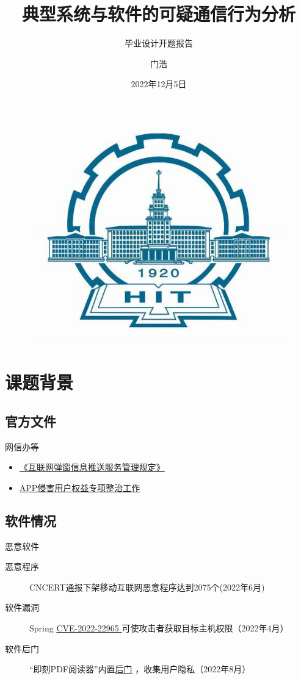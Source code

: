 \documentclass{beamer}
\author{门浩}
\title{典型系统与软件的可疑通信行为分析}
\subtitle{毕业设计开题报告}
\institute[计算机科学与技术]{哈尔滨工业大学（威海）计算机科学与技术学院}
\date{2022年12月5日}
\begin{document}
 
\begin{frame}
    \titlepage
    \begin{figure}[htpb]
        \begin{center}
            \includegraphics[width=0.2\linewidth]{pic/hitcolor.jpg}
        \end{center}
    \end{figure}
\end{frame}

\begin{frame}
    \tableofcontents[sectionstyle=show,subsectionstyle=show/shaded/hide,subsubsectionstyle=show/shaded/hide]
\end{frame}


\section{课题背景}
\subsection{官方文件}
\begin{frame}{网信办等}
        \begin{itemize}
        \item \href{http://www.cac.gov.cn/2022-09/08/c_1664260384702890.htm}{《互联网弹窗信息推送服务管理规定》}
        \item \href{https://www.miit.gov.cn/zwgk/zcwj/wjfb/txy/art/2020/art_ef035831a43142259ccab5a758704747.html}{APP侵害用户权益专项整治工作}
    \end{itemize}
\end{frame}

\subsection{软件情况}
\begin{frame}{恶意软件}
        \begin{description}
        \item[恶意程序] CNCERT通报下架移动互联网恶意程序达到2075个(2022年6月)
        \item[软件漏洞] Spring \href{https://spring.io/blog/2022/03/31/spring-framework-rce-early-announcement}{CVE-2022-22965
} 可使攻击者获取目标主机权限（2022年4月）
        \item[软件后门] “即刻PDF阅读器”内置\href{https://www.huorong.cn/info/1660892844878.html}{后门} ，收集用户隐私（2022年8月）
    \end{description}
\end{frame}
\end{document}
